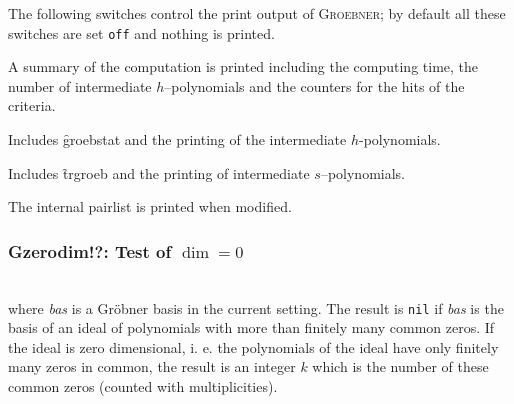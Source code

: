 The following switches control the print output of \textsc{Groebner}; by
default all these switches are set \texttt{off} and nothing is printed.
\begin{description}
\item[\f{groebstat} --]
\hypertarget{switch:GROEBSTAT}{}
  A summary of the computation is printed
including the computing time, the number of intermediate
$h$--polynomials and the counters for the hits of the criteria.

\item[\f{trgroeb} --]
  \hypertarget{switch:TRGROEB}{}
  Includes \f{groebstat} and the printing of the
intermediate $h$-polynomials.

\item[\f{trgroebs} --]
    \hypertarget{switch:TRGROEBS}{}
Includes \f{trgroeb} and the printing of
intermediate $s$--poly\-nomials.

\item[\f{trgroeb1} --]
    \hypertarget{switch:TRGROEB1}{}
The internal pairlist is printed when modified.
\end{description}

\subsubsection{\f{\textbf{Gzerodim!?}}: Test of $\dim = 0$}
\begin{description}
\item[\f{gzerodim!?} \emph{bas}]\mbox{}\\
  \hypertarget{operator:GZERODIM!?}{}
where {\it bas} is a Gr\"obner basis in the current setting.
The result is \texttt{nil} if {\it bas} is the
basis of an ideal of polynomials with more than finitely many common zeros.
If the ideal is zero dimensional, i. e. the polynomials of the ideal have only
finitely many zeros in common, the result is an integer $k$ which is the number
of these common zeros (counted with multiplicities).
\end{description}

